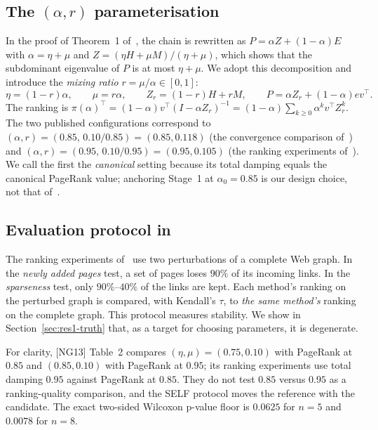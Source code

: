 \documentclass[11pt,a4paper]{article}
\theoremstyle{definition}
\theoremstyle{remark}
\begin{document}
\subsection{The \texorpdfstring{$(\alpha,r)$}{(α, r)} parameterisation}
In the proof of Theorem~1 of~\cite{ng13}, the chain is rewritten as $P=\alpha Z+(1-\alpha)E$ with
$\alpha=\eta+\mu$ and $Z=(\eta H+\mu M)/(\eta+\mu)$, which shows that the subdominant eigenvalue of $P$
is at most $\eta+\mu$. We adopt this decomposition and introduce the \emph{mixing ratio}
$r=\mu/\alpha\in[0,1]$:
\begin{equation}
\eta=(1-r)\alpha,\qquad \mu=r\alpha,\qquad Z_r=(1-r)H+rM,\qquad P=\alpha Z_r+(1-\alpha)ev^\top .
\label{eq:param}
\end{equation}
The ranking is $\pi(\alpha)^\top=(1-\alpha)v^\top(I-\alpha Z_r)^{-1}=(1-\alpha)\sum_{k\ge0}\alpha^k v^\top Z_r^k$.
The two published configurations correspond to $(\alpha,r)=(0.85,\,0.10/0.85)=(0.85,0.118)$ (the
convergence comparison of~\cite[Table~2]{ng13}) and $(\alpha,r)=(0.95,\,0.10/0.95)=(0.95,0.105)$
(the ranking experiments of~\cite[§4]{ng13}). We call the first the \emph{canonical} setting because its
total damping equals the canonical PageRank value; anchoring Stage~1 at $\alpha_0=0.85$ is our design
choice, not that of~\cite{ng13}.

\subsection{Evaluation protocol in~\texorpdfstring{\cite{ng13}}{[NG13]}}
The ranking experiments of~\cite{ng13} use two perturbations of a complete Web graph. In the
\emph{newly added pages} test, a set of pages loses $90\%$ of its incoming links. In the
\emph{sparseness} test, only $90\%$--$40\%$ of the links are kept. Each method's ranking on the
perturbed graph is compared, with Kendall's $\tau$, to \emph{the same method's} ranking on the complete
graph. This protocol measures stability. We show in Section~\ref{sec:res1-truth} that, as a target for
choosing parameters, it is degenerate.

For clarity, [NG13] Table~2 compares $(\eta,\mu)=(0.75,0.10)$ with PageRank at $0.85$ and
$(0.85,0.10)$ with PageRank at $0.95$; its ranking experiments use total damping $0.95$ against
PageRank at $0.85$. They do not test $0.85$ versus $0.95$ as a ranking-quality comparison, and
the SELF protocol moves the reference with the candidate. The exact two-sided Wilcoxon p-value
floor is $0.0625$ for $n=5$ and $0.0078$ for $n=8$.
\end{document}

